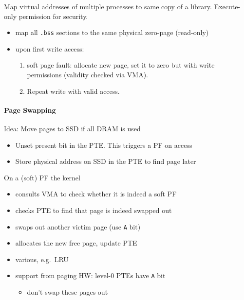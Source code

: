 \newpar{}

Map virtual addresses of multiple processes to same copy of a library. Execute-only permission for security.

\newpar{}

\begin{itemize}
    \item map all \texttt{.bss} sections to the same physical zero-page (read-only)
    \item upon first write access:
          \begin{enumerate}
              \item soft page fault: allocate new page, set it to zero but with write permissions (validity checked via VMA).
              \item Repeat write with valid access.
          \end{enumerate}
\end{itemize}

\paragraph{Page Swapping}
Idea: Move pages to SSD if all DRAM is used %
\begin{itemize}
    \item Unset present bit in the PTE. This triggers a PF on access
    \item Store physical address on SSD in the PTE to find page later
\end{itemize}

\newpar{}

On a (soft) PF the kernel
\begin{itemize}
    \item consults VMA to check whether it is indeed a soft PF
    \item checks PTE to find that page is indeed swapped out
    \item swaps out another victim page (use \texttt{A} bit)
    \item allocates the new free page, update PTE
\end{itemize}

\newpar{}

\begin{itemize}
    \item various, e.g.\ LRU
    \item support from paging HW: level-0 PTEs have \texttt{A} bit
          \begin{itemize}
              \item don't swap these pages out
          \end{itemize}
\end{itemize}

